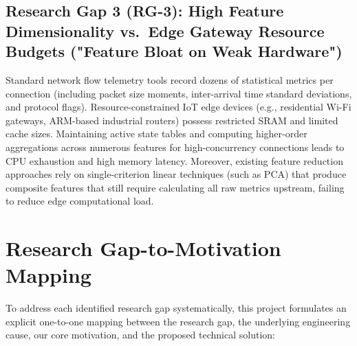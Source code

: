 \documentclass[12pt,a4paper]{report}
\begin{document}
\subsection*{Research Gap 3 (RG-3): High Feature Dimensionality vs.\ Edge Gateway Resource Budgets ("Feature Bloat on Weak Hardware")}
Standard network flow telemetry tools record dozens of statistical metrics per connection (including packet size moments, inter-arrival time standard deviations, and protocol flags). 
Resource-constrained IoT edge devices (e.g., residential Wi-Fi gateways, ARM-based industrial routers) possess restricted SRAM and limited cache sizes. 
Maintaining active state tables and computing higher-order aggregations across numerous features for high-concurrency connections leads to CPU exhaustion and high memory latency. 
Moreover, existing feature reduction approaches rely on single-criterion linear techniques (such as PCA) that produce composite features that still require calculating all raw metrics upstream, failing to reduce edge computational load.

\section{Research Gap-to-Motivation Mapping}
To address each identified research gap systematically, this project formulates an explicit one-to-one mapping between the research gap, the underlying engineering cause, our core motivation, and the proposed technical solution:
\end{document}
